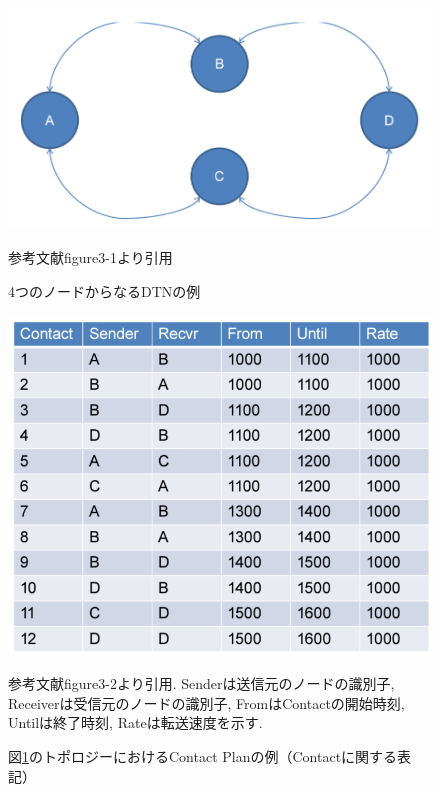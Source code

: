\begin{figure}[tbh]
    \centering
    \includegraphics[width=0.5\textheight]{img/contact_example_topology.pdf}
    \caption{4つのノードからなるDTNの例}
    \label{fig:contact_example_topology}
    \begin{minipage}{\textwidth}
        \centering
        \vspace{3mm}
        参考文献\cite{schedule_aware_bundle_routing}figure3-1より引用
    \end{minipage}
\end{figure}
\begin{figure}[tbh]
    \centering
    \includegraphics[width=0.5\textheight]{img/contact_example_contactplan.pdf}
    \caption{図\ref{fig:contact_example_topology}のトポロジーにおけるContact Planの例（Contactに関する表記）}
    \label{fig:contact_example_contactplan}
    \begin{minipage}{\textwidth}
        \raggedright
        \vspace{3mm}
        参考文献\cite{schedule_aware_bundle_routing}figure3-2より引用. 
        Senderは送信元のノードの識別子, Receiverは受信元のノードの識別子, FromはContactの開始時刻, Untilは終了時刻, Rateは転送速度を示す.  
    \end{minipage}
\end{figure}
